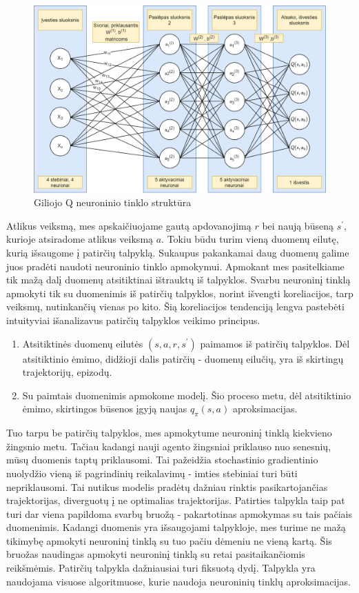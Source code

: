 \documentclass[a4paper, 12pt]{article}
\begin{document}
\begin{figure}[h]
\centering
\includegraphics[width=1\textwidth]{Q Neuronu diagrama}
\caption{Giliojo Q neuroninio tinklo struktūra}
\label{QNeuroniniaiTinklai}
\end{figure}


Atlikus veiksmą, mes apskaičiuojame gautą apdovanojimą $r$ bei naują būseną $s^\prime$, kurioje atsiradome atlikus veiksmą $a$. Tokiu būdu turim vieną duomenų eilutę, kurią išsaugome į patirčių talpyklą. Sukaupus pakankamai daug duomenų galime juos pradėti naudoti neuroninio tinklo apmokymui. Apmokant mes pasitelkiame tik mažą dalį duomenų atsitiktinai ištrauktų iš talpyklos. Svarbu neuroninį tinklą apmokyti tik su duomenimis iš patirčių talpyklos, norint išvengti koreliacijos, tarp veiksmų, nutinkančių vienas po kito. Šią koreliacijos tendenciją lengva pastebėti intuityviai išanalizavus patirčių talpyklos veikimo principus.

\begin{enumerate}
  \addtolength{\itemsep}{-0.5\baselineskip} 
  \item Atsitiktinės duomenų eilutės $(s,a,r,s^\prime)$ paimamos iš patirčių talpyklos. Dėl atsitiktinio ėmimo, didžioji dalis patirčių - duomenų eilučių, yra iš skirtingų trajektorijų, epizodų.
  \item Su paimtais duomenimis apmokome modelį. Šio proceso metu, dėl atsitiktinio ėmimo, skirtingos būsenos įgyją naujas $q_{\pi}(s, a)$ aproksimacijas. 
\end{enumerate}

Tuo tarpu be patirčių talpyklos, mes apmokytume neuroninį tinklą kiekvieno žingsnio metu. Tačiau kadangi nauji agento žingsniai priklauso nuo senesnių, mūsų duomenis taptų priklausomi. Tai pažeidžia stochastinio gradientinio nuolydžio vieną iš pagrindinių reikalavimų - imties stebiniai turi būti nepriklausomi. Tai nutikus modelis pradėtų dažniau rinktis pasikartojančias trajektorijas, diverguotų į ne optimalias trajektorijas. Patirties talpykla taip pat turi dar viena papildoma svarbų bruožą - pakartotinas apmokymas su tais pačiais duomenimis. Kadangi duomenis yra išsaugojami talpykloje, mes turime ne mažą tikimybę apmokyti neuroninį tinklą su tuo pačiu dėmeniu ne vieną kartą. Šis bruožas naudingas apmokyti neuroninį tinklą su retai pasitaikančiomis reikšmėmis. Patirčių talpykla dažniausiai turi fiksuotą dydį. Talpykla yra naudojama visuose algoritmuose, kurie naudoja neuroninių tinklų aproksimacijas. 
\end{document}
